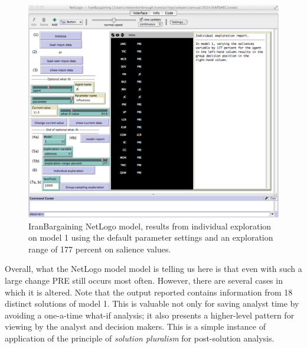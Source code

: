 \begin{figure}[t] %
   \centering
   \includegraphics[width=\textwidth]{chapters/gdp/figures/IranBargainingModel1IndividualExploration.pdf} 
   \caption{IranBargaining NetLogo model, results from individual exploration on model 1 using the default parameter settings and an exploration range of 177 percent on salience values.}
   \label{fig:IranBargainingModel1IndividualExploration}
\end{figure}


Overall, what the NetLogo model model is telling us here is that even with such a large change PRE still occurs most often. However, there are several cases in which it is altered. Note that the output reported contains information from 18 distinct solutions of model 1.  This is valuable not only for saving analyst time by avoiding a one-a-time what-if analysis; it also presents a higher-level pattern for viewing by the analyst and decision makers. This is a simple instance of application of the principle of \emph{solution pluralism} for post-solution analysis.



%


